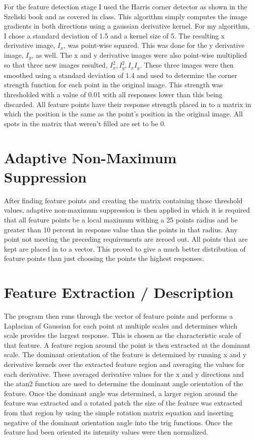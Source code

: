 \documentclass[10pt,twocolumn,letterpaper]{article}
\begin{document}
For the feature detection stage I used the Harris corner detector as shown in the Szeliski book and as covered in class. This algorithm simply computes the image gradients in both directions using a gaussian derivative kernel. For my algorithm, I chose a standard deviation of 1.5 and a kernel size of 5. The resulting x derivative image, $I_x$, was point-wise squared. This was done for the y derivative image, $I_y$, as well. The x and y derivative images were also point-wise multiplied so that three new images resulted, $I_x^2, I_y^2, I_xI_y$. These three images were then smoothed using a standard deviation of 1.4 and used to determine the corner strength function for each point in the original image. This strength was thresholded with a value of 0.01 with all responses lower than this being discarded. All feature points have their response strength placed in to a matrix in which the position is the same as the point's position in the original image. All spots in the matrix that weren't filled are set to be 0.


\section{Adaptive Non-Maximum Suppression}
After finding feature points and creating the matrix containing those threshold values, adaptive non-maximum suppression is then applied in which it is required that all feature points be a local maximum withing a 25 points radius and be greater than 10 percent in response value than the points in that radius. Any point not meeting the preceding requirements are zeroed out. All points that are kept are placed in to a vector. This proved to give a much better distribution of feature points than just choosing the points the highest responses.

\section{Feature Extraction / Description}
The program then runs through the vector of feature points and performs a Laplacian of Gaussian for each point at multiple scales and determines which scale provides the largest response. This is chosen as the characteristic scale of that feature. A feature region around the point is then extracted at the dominant scale. The dominant orientation of the feature is determined by running x and y derivative kernels over the extracted feature region and averaging the values for each derivative. These averaged derivative values for the x and y directions and the atan2 function are used to determine the dominant angle orientation of the feature. Once the dominant angle was determined, a larger region around the feature was extracted and a rotated patch the size of the feature was extracted from that region by using the simple rotation matrix equation and inserting negative of the dominant orientation angle into the trig functions. Once the feature had been oriented its intensity values were then normalized. 
\end{document}
